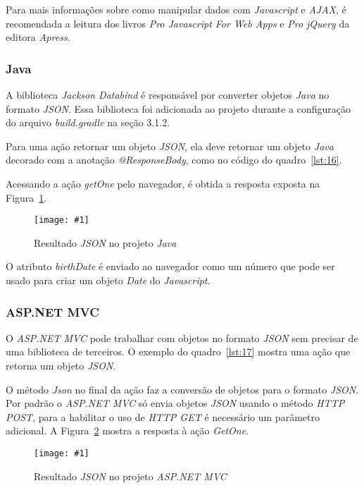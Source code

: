 \documentclass[a4paper,12pt]{article}
\newcommand{\figura}[3] {
	\begin{figure}[ht]
		\centering
		\texttt{[image: \#1]}
		\caption{#2}
		\label{#3}
	\end{figure}
	\FloatBarrier
}
\newcommand{\est}[1] {
\textit{#1}}
\newcommand{\classe}[1] {
\textit{#1}}
\newcommand{\arquivo}[1] {
\textit{#1}}
\newcommand{\sigla}[1] {
\textit{#1}}
\newcommand{\lang}[1] {
\textit{#1}}
\newcommand{\annotation}[1] {
\textit{#1}}
\newcommand{\metodo}[1] {
\textit{#1}}
\newcommand{\javacode}[3] {
	
}
\newcommand{\sharpcode}[3] {
	
}
\begin{document}
Para mais informações sobre como manipular dados com \lang{Javascript} e \sigla{AJAX}, é recomendada a leitura dos livros \est{Pro Javascript For Web Apps} e \est{Pro jQuery} da editora \est{Apress}.

\subsubsection{Java}

A biblioteca \est{Jackson Databind} é responsável por converter objetos \lang{Java} no formato \sigla{JSON}. Essa biblioteca foi adicionada ao projeto durante a configuração do arquivo \arquivo{build.gradle} na seção 3.1.2. 

Para uma ação retornar um objeto \sigla{JSON}, ela deve retornar um objeto \lang{Java} decorado com a anotação \annotation{@ResponseBody}, como no código do quadro~\ref{lst:16}.

\javacode{code/16.txt}{Ação no \est{Spring MVC} que retorna um objeto \sigla{JSON}}{lst:16}

Acessando a ação \metodo{getOne} pelo navegador, é obtida a resposta exposta na Figura~\ref{fig:32}.

\figura{32.png}{Resultado \sigla{JSON} no projeto \lang{Java}}{fig:32}

O atributo \est{birthDate} é enviado ao navegador como um número que pode ser usado para criar um objeto \classe{Date} do \lang{Javascript}.

\subsubsection{ASP.NET MVC}

O \est{ASP.NET MVC} pode trabalhar com objetos no formato \sigla{JSON} sem precisar de uma biblioteca de terceiros. O exemplo do quadro~\ref{lst:17} mostra uma ação que retorna um objeto \sigla{JSON}.

\sharpcode{code/17.txt}{Ação no \est{ASP.NET MVC} que retorna um objeto \sigla{JSON}}{lst:17}

O método \metodo{Json} no final da ação faz a conversão de objetos para o formato \sigla{JSON}. Por padrão o \est{ASP.NET MVC} só envia objetos \sigla{JSON} usando o método \est{HTTP POST}, para a habilitar o uso de \est{HTTP GET} é necessário um parâmetro adicional. A Figura~\ref{fig:33} mostra a resposta à ação \metodo{GetOne}.

\figura{33.png}{Resultado \sigla{JSON} no projeto \est{ASP.NET MVC}}{fig:33}
\end{document}
